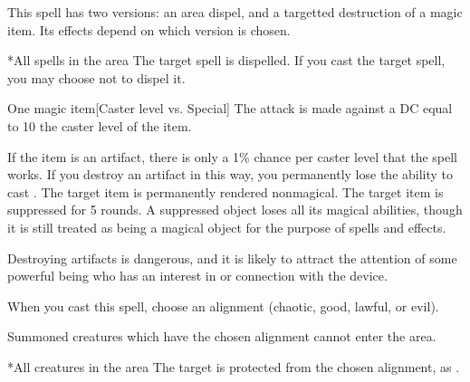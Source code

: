 \begin{spellheader}
    \spellspecial This spell has two versions: an area dispel, and a targetted destruction of a magic item. Its effects depend on which version is chosen.
\end{spellheader}
\begin{spelleffects}
    \spellline
    \begin{spelltargets}*{All spells in the area}
        \spelleffect The target spell is dispelled. If you cast the target spell, you may choose not to dispel it.
    \end{spelltargets}
    \begin{spelltarget}{One magic item}[Caster level vs. Special]
        \spellspecial The attack is made against a DC equal to 10 \add the caster level of the item.

        If the item is an artifact, there is only a 1\% chance per caster level that the spell works. If you destroy an artifact in this way, you permanently lose the ability to cast .
        \spellsuccess The target item is permanently rendered nonmagical.
        \spellfailure The target item is suppressed for 5 rounds. A suppressed object loses all its magical abilities, though it is still treated as being a magical object for the purpose of spells and effects.
    \end{spelltarget}
\end{spelleffects}
\begin{spellfooter}
    \spellnotes Destroying artifacts is dangerous, and it is likely to attract the attention of some powerful being who has an interest in or connection with the device.
\end{spellfooter}

\begin{spellheader}
    \spelldur{\durshort \dismissable}
    \spellspecial When you cast this spell, choose an alignment (chaotic, good, lawful, or evil).
\end{spellheader}
\begin{spelleffects}
    \spellline
    \spelleffect Summoned creatures which have the chosen alignment cannot enter the area.
    \begin{spelltargets}*{All creatures in the area}
        \spelleffect The target is protected from the chosen alignment, as .
    \end{spelltargets}
\end{spelleffects}

